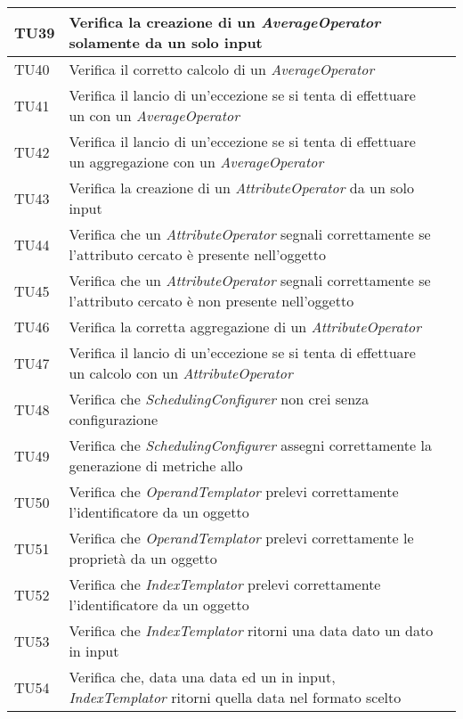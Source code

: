\begin{longtable}{  | >{\centering\arraybackslash}m{2.5cm} 
						| >{\raggedright\arraybackslash}m{9cm} 
						| >{\centering\arraybackslash}m{3.5cm} | }
				TU39 & Verifica la creazione di un \textit{AverageOperator} solamente da un solo input
						& \donetext{} \\ \hline
				TU40 & Verifica il corretto calcolo di un \textit{AverageOperator}
						& \donetext{} \\ \hline
				TU41 & Verifica il lancio di un'eccezione se si tenta di effettuare un \eng{match} con un \textit{AverageOperator}
						& \donetext{} \\ \hline
				TU42 & Verifica il lancio di un'eccezione se si tenta di effettuare un aggregazione con un \textit{AverageOperator}
						& \donetext{} \\ \hline
					
				TU43 & Verifica la creazione di un \textit{AttributeOperator} da un solo input
						& \donetext{} \\ \hline
				TU44 & Verifica che un \textit{AttributeOperator} segnali correttamente se 
						l'attributo cercato è presente nell'oggetto
						& \donetext{} \\ \hline
				TU45 & Verifica che un \textit{AttributeOperator} segnali correttamente se 
						l'attributo cercato è non presente nell'oggetto
						& \donetext{} \\ \hline
				TU46 & Verifica la corretta aggregazione di un \textit{AttributeOperator}
						& \donetext{} \\ \hline	
				TU47 & Verifica il lancio di un'eccezione se si tenta di effettuare un calcolo con un \textit{AttributeOperator}
						& \donetext{} \\ \hline
						
				TU48 & Verifica che \textit{SchedulingConfigurer} non crei \eng{tasks} senza configurazione
						& \donetext{} \\ \hline
				TU49 & Verifica che \textit{SchedulingConfigurer} assegni correttamente la generazione di metriche allo \eng{scheduler}
						& \donetext{} \\ \hline
						
				TU50 & Verifica che \textit{OperandTemplator} prelevi correttamente l'identificatore da un oggetto
						& \donetext{} \\ \hline
				TU51 & Verifica che \textit{OperandTemplator} prelevi correttamente le proprietà da un oggetto
						& \donetext{} \\ \hline
				
				TU52 & Verifica che \textit{IndexTemplator} prelevi correttamente l'identificatore da un oggetto
						& \donetext{} \\ \hline
				TU53 & Verifica che \textit{IndexTemplator} ritorni una data dato un \eng{template} dato in input
						& \donetext{} \\ \hline
				TU54 & Verifica che, data una data ed un \eng{template} in input, \textit{IndexTemplator} ritorni 
						quella data nel formato scelto
						& \donetext{} \\ \hline






\end{longtable}
